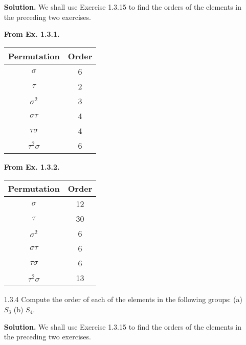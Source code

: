 \begin{enumerate}
      \textbf{Solution.} We shall use Exercise 1.3.15 to find the orders of the 
      elements in the preceding two exercises. 

      \textbf{From Ex. 1.3.1.}
      \begin{center}
         \begin{tabular}{@{}|c|c|@{}}   \hline
            Permutation    & Order   \\ \hline
            $\sigma$       & 6       \\ \hline
            $\tau$         & 2       \\ \hline 
            $\sigma^2$     & 3       \\ \hline
            $\sigma\tau$   & 4       \\ \hline
            $\tau\sigma$   & 4       \\ \hline
            $\tau^2\sigma$ & 6       \\ \hline
         \end{tabular}
      \end{center} 

      \textbf{From Ex. 1.3.2.}
      \begin{center}
         \begin{tabular}{@{}|c|c|@{}}     \hline
            Permutation    & Order     \\ \hline
            $\sigma$       & 12        \\ \hline
            $\tau$         & 30        \\ \hline 
            $\sigma^2$     & 6         \\ \hline
            $\sigma\tau$   & 6         \\ \hline
            $\tau\sigma$   & 6         \\ \hline
            $\tau^2\sigma$ & 13        \\ \hline
         \end{tabular}
      \end{center}
   \item[1.3.4]   Compute the order of each of the elements in the following
                  groups: (a) $S_3$ \qquad (b) $S_4$.

      \textbf{Solution.} We shall use Exercise 1.3.15 to find the orders of the 
      elements in the preceding two exercises.


\end{enumerate}
